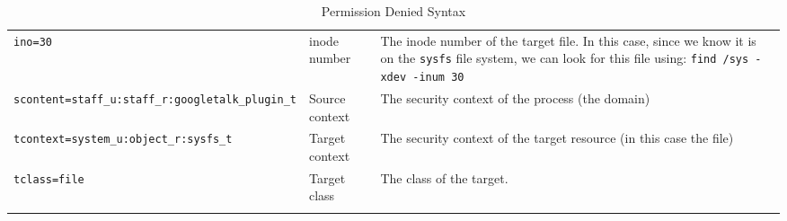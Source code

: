 \begin{longtable}{p{.15\linewidth}p{.15\linewidth}p{.65\linewidth}}
\texttt{ino=30}
&inode number
&The inode number of the target file. In this case, since we know it is on the \texttt{sysfs} file system, we can look for this file using: \texttt{find /sys -xdev -inum 30}
\\

\texttt{scontent=staff\_u:staff\_r:googletalk\_plugin\_t}
&Source context
&The security context of the process (the domain)
\\

\texttt{tcontext=system\_u:object\_r:sysfs\_t}
&Target context
&The security context of the target resource (in this case the file)
\\

\texttt{tclass=file}
&Target class
&The class of the target.
\\

\midrule
\caption{Permission Denied Syntax} 
\label{tab:permissiondeniedsyntax}
\end{longtable}






